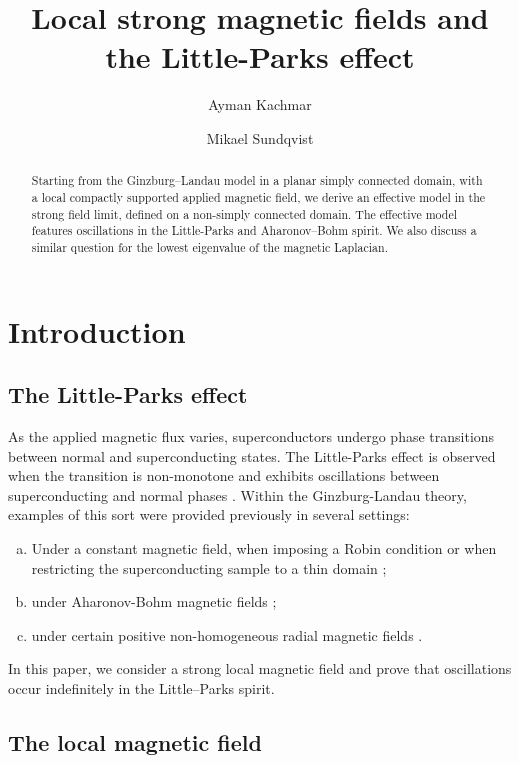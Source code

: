 \documentclass[11pt]{amsart}
\title[Local strong magnetic fields]{Local strong magnetic fields and the Little-Parks effect}
\author[A. Kachmar]{Ayman Kachmar}
\author[M. Sundqvist]{Mikael Sundqvist}
\theoremstyle{definition}
\numberwithin{equation}{section}
\begin{document}
\begin{abstract}
Starting from the Ginzburg--Landau model in a planar simply connected domain, with a local compactly supported applied magnetic field, we derive  an effective model in the strong field limit, defined on a non-simply connected domain. The effective model features oscillations in the Little-Parks and Aharonov--Bohm spirit. We also discuss a similar question for the lowest eigenvalue of the magnetic Laplacian.
%
\end{abstract}

\maketitle

\section{Introduction}\label{sec:intro}

\subsection{The Little-Parks effect}
%
As the applied  magnetic flux varies, superconductors undergo phase transitions between normal and superconducting states. The Little-Parks effect is observed when the transition is non-monotone and exhibits oscillations between superconducting and normal phases \cite{LP}. Within the Ginzburg-Landau theory,
examples of this sort  were provided previously  in several settings:
\begin{enumerate}[a)]
\item Under a constant magnetic field, when imposing a Robin condition \cite{G1, KS} or when restricting the superconducting sample to a thin domain \cite{FS, HK, RS, ShSt};
\item under Aharonov-Bohm magnetic fields  \cite{KP};
\item under certain positive non-homogeneous radial magnetic fields \cite{FS}.
\end{enumerate}

In this paper, we consider a strong local magnetic field and prove that oscillations occur indefinitely in the Little--Parks spirit.

\subsection{The local magnetic field}
\end{document}
